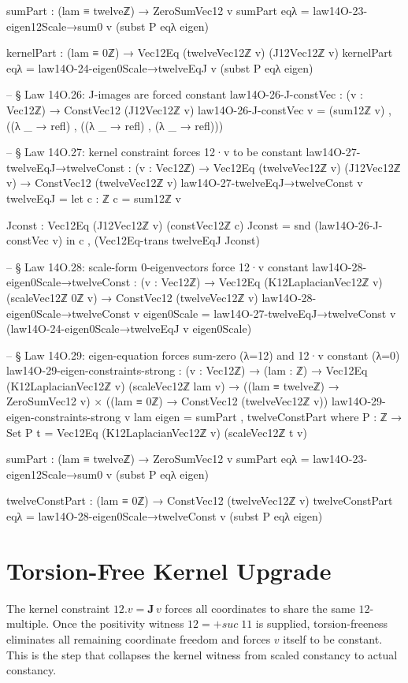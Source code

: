 \documentclass[11pt,a4paper]{book}
\def\cdot{.}%
\def\texttt#1{#1}%
\begin{document}
\begin{code}
    sumPart : (lam ≡ twelveℤ) → ZeroSumVec12 v
    sumPart eqλ = law14O-23-eigen12Scale→sum0 v (subst P eqλ eigen)

    kernelPart : (lam ≡ 0ℤ) → Vec12Eq (twelveVec12ℤ v) (J12Vec12ℤ v)
    kernelPart eqλ = law14O-24-eigen0Scale→twelveEqJ v (subst P eqλ eigen)

-- § Law 14O.26: J-images are forced constant
law14O-26-J-constVec : (v : Vec12ℤ) → ConstVec12 (J12Vec12ℤ v)
law14O-26-J-constVec v = (sum12ℤ v) , ((λ _ → refl) , ((λ _ → refl) , (λ _ → refl)))

-- § Law 14O.27: kernel constraint forces 12·v to be constant
law14O-27-twelveEqJ→twelveConst : (v : Vec12ℤ) →
  Vec12Eq (twelveVec12ℤ v) (J12Vec12ℤ v) → ConstVec12 (twelveVec12ℤ v)
law14O-27-twelveEqJ→twelveConst v twelveEqJ =
  let
    c : ℤ
    c = sum12ℤ v

    Jconst : Vec12Eq (J12Vec12ℤ v) (constVec12ℤ c)
    Jconst = snd (law14O-26-J-constVec v)
  in
  c , (Vec12Eq-trans twelveEqJ Jconst)

-- § Law 14O.28: scale-form 0-eigenvectors force 12·v constant
law14O-28-eigen0Scale→twelveConst : (v : Vec12ℤ) →
  Vec12Eq (K12LaplacianVec12ℤ v) (scaleVec12ℤ 0ℤ v) → ConstVec12 (twelveVec12ℤ v)
law14O-28-eigen0Scale→twelveConst v eigen0Scale =
  law14O-27-twelveEqJ→twelveConst v (law14O-24-eigen0Scale→twelveEqJ v eigen0Scale)

-- § Law 14O.29: eigen-equation forces sum-zero (λ=12) and 12·v constant (λ=0)
law14O-29-eigen-constraints-strong : (v : Vec12ℤ) → (lam : ℤ) →
  Vec12Eq (K12LaplacianVec12ℤ v) (scaleVec12ℤ lam v) →
  ((lam ≡ twelveℤ) → ZeroSumVec12 v) ×
  ((lam ≡ 0ℤ) → ConstVec12 (twelveVec12ℤ v))
law14O-29-eigen-constraints-strong v lam eigen = sumPart , twelveConstPart
  where
    P : ℤ → Set
    P t = Vec12Eq (K12LaplacianVec12ℤ v) (scaleVec12ℤ t v)

    sumPart : (lam ≡ twelveℤ) → ZeroSumVec12 v
    sumPart eqλ = law14O-23-eigen12Scale→sum0 v (subst P eqλ eigen)

    twelveConstPart : (lam ≡ 0ℤ) → ConstVec12 (twelveVec12ℤ v)
    twelveConstPart eqλ = law14O-28-eigen0Scale→twelveConst v (subst P eqλ eigen)
\end{code}


\section{Torsion-Free Kernel Upgrade}

The kernel constraint $12\!\cdot\!v = \mathbf{J}\,v$ forces
all coordinates to share the same $12$-multiple.
Once the positivity witness $12 = \texttt{+suc}\;11$ is supplied,
torsion-freeness eliminates all remaining coordinate freedom
and forces $v$ itself to be constant.  This is the step that collapses the
kernel witness from scaled constancy to actual constancy.
\end{document}
